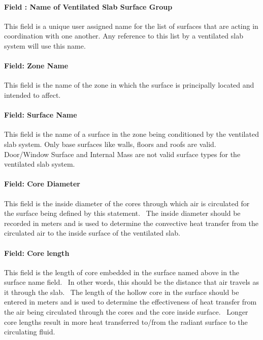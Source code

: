 \paragraph{Field : Name of Ventilated Slab Surface Group}\label{field-name-of-ventilated-slab-surface-group}

This field is a unique user assigned name for the list of surfaces that are acting in coordination with one another. Any reference to this list by a ventilated slab system will use this name.

\paragraph{Field: Zone Name}\label{field-zone-name-5-003}

This field is the name of the zone in which the surface is principally located and intended to affect.

\paragraph{Field: Surface Name}\label{field-surface-name-003}

This field is the name of a surface in the zone being conditioned by the ventilated slab system. Only base surfaces like walls, floors and roofs are valid. Door/Window Surface and Internal Mass are not valid surface types for the ventilated slab system.

\paragraph{Field: Core Diameter}\label{field-core-diameter}

This field is the inside diameter of the cores through which air is circulated for the surface being defined by this statement.~ The inside diameter should be recorded in meters and is used to determine the convective heat transfer from the circulated air to the inside surface of the ventilated slab.

\paragraph{Field: Core length}\label{field-core-length}

This field is the length of core embedded in the surface named above in the surface name field.~ In other words, this should be the distance that air travels as it through the slab.~ The length of the hollow core in the surface should be entered in meters and is used to determine the effectiveness of heat transfer from the air being circulated through the cores and the core inside surface.~ Longer core lengths result in more heat transferred to/from the radiant surface to the circulating fluid.

